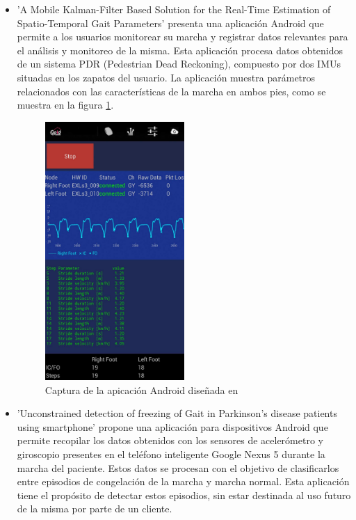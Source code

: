 \begin{itemize}
    \item 'A Mobile Kalman-Filter Based Solution for the Real-Time Estimation of Spatio-Temporal Gait Parameters' \cite{7173053} presenta una aplicación Android que permite a los usuarios monitorear su marcha y registrar datos relevantes para el análisis y monitoreo de la misma. Esta aplicación procesa datos obtenidos de un sistema PDR (Pedestrian Dead Reckoning), compuesto por dos IMUs situadas en los zapatos del usuario. La aplicación muestra parámetros relacionados con las características de la marcha en ambos pies, como se muestra en la figura \ref{fig:androidappmarcha}.
    \begin{figure}[h]
        \centering
        \includegraphics[width=0.5\textwidth]{img/Androidapp1.png}
        \caption{Captura de la apicación Android diseñada en \cite{7173053}}
        \label{fig:androidappmarcha}
    \end{figure}
    \item 'Unconstrained detection of freezing of Gait in Parkinson's disease patients using smartphone' \cite{7319209} propone una aplicación para dispositivos Android que permite recopilar los datos obtenidos con los sensores de acelerómetro y giroscopio presentes en el teléfono inteligente  Google Nexus 5  durante la marcha del paciente. Estos datos se procesan con el objetivo de clasificarlos entre episodios de congelación de la marcha y marcha normal. Esta aplicación tiene el propósito de detectar estos episodios, sin estar destinada al uso futuro de la misma por parte de un cliente.

\end{itemize}
